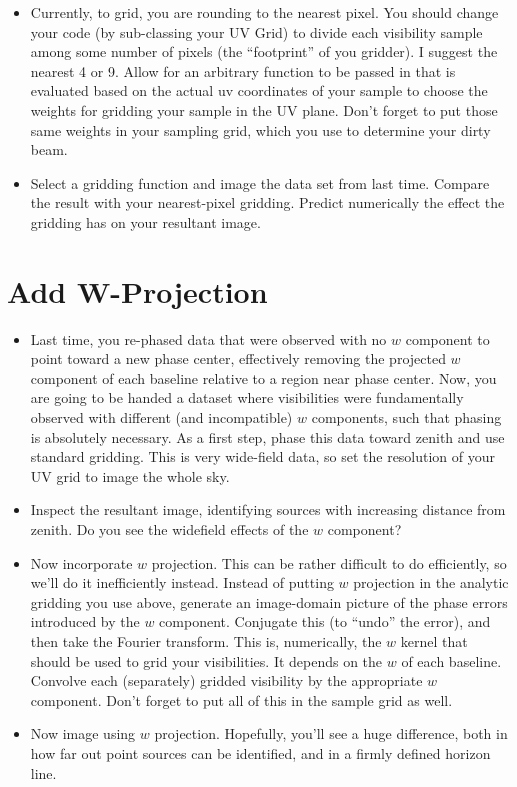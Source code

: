 \documentclass[11pt]{article}
\begin{document}
\begin{itemize}
\item Currently, to grid, you are rounding to the nearest pixel.  You should change your code (by
sub-classing your UV Grid) to divide each visibility sample among some number of pixels (the ``footprint''
of you gridder).  I suggest the nearest 4 or 9.  Allow for an arbitrary function to be passed in
that is evaluated based on the actual uv coordinates of your sample to choose the weights for gridding
your sample in the UV plane.  Don't forget to put those same weights in your sampling grid, which
you use to determine your dirty beam.
\item Select a gridding function and image the data set from last time.  Compare the result with
your nearest-pixel gridding.  Predict numerically the effect the gridding has on your resultant image.
\end{itemize}

\section{Add W-Projection}

\begin{itemize}
\item Last time, you re-phased data that were observed with no $w$ component to point toward a new 
phase center, effectively removing the projected $w$ component
of each baseline relative to a region near phase center.  Now, you are going to be handed a dataset where
visibilities were fundamentally observed with different (and incompatible) $w$ components, such that
phasing is absolutely necessary.  As a first step, phase this data toward zenith and use standard gridding.
This is very wide-field data, so set the resolution of your UV grid to image the whole sky.
\item Inspect the resultant image, identifying sources with increasing distance from zenith.  Do you
see the widefield effects of the $w$ component?
\item Now incorporate $w$ projection.  This can be rather difficult to do efficiently, so we'll do it inefficiently instead.  Instead of putting $w$ projection in the analytic gridding you use above, generate an image-domain
picture of the phase errors introduced by the $w$ component.  Conjugate this (to ``undo'' the error), and 
then take the Fourier transform.  This is,
numerically, the $w$ kernel that should be used to grid your visibilities.  It depends on the $w$ of each baseline.
Convolve each (separately) gridded visibility by the appropriate $w$ component.  Don't forget to put all of this
in the sample grid as well.
\item Now image using $w$ projection.  Hopefully, you'll see a huge difference, both in how far out point
sources can be identified, and in a firmly defined horizon line.
\end{itemize}
\end{document}
